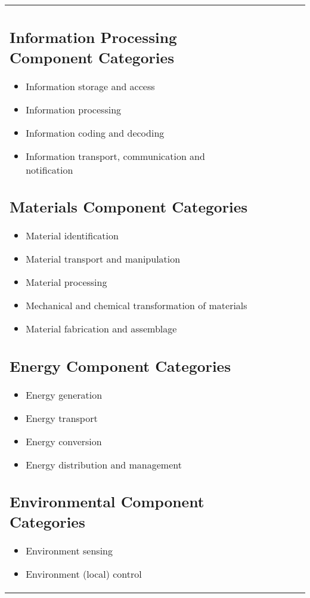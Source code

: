 \begin{table}[h]
\begin{center}
\begin{tabular}{| l l l l l l |}
\subsection{Information Processing Component Categories}
\begin{itemize}
\item Information storage and access
\item Information processing
\item Information coding and decoding
\item Information transport, communication and notification
\end{itemize}

\subsection{Materials Component Categories}
\begin{itemize}
\item Material identification
\item Material transport and manipulation
\item Material processing
\item Mechanical and chemical transformation of materials
\item Material fabrication and assemblage
\end{itemize}

\subsection{Energy Component Categories}
\begin{itemize}
\item Energy generation
\item Energy transport
\item Energy conversion
\item Energy distribution and management
\end{itemize}

\subsection{Environmental Component Categories}
\begin{itemize}
\item Environment sensing
\item Environment (local) control
\end{itemize}


\end{tabular}
\end{center}
\end{table}
